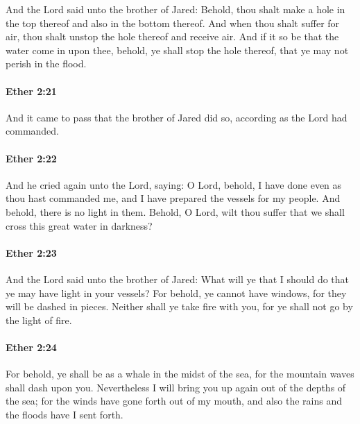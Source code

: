 			And the Lord said unto the brother of Jared:
			Behold, thou shalt make a hole in the top thereof
			and also in the bottom thereof.
			And when thou shalt suffer for air,
			thou shalt unstop the hole thereof and receive air.
			And if it so be that the water come in upon thee,
			behold, ye shall stop the hole thereof,
			that ye may not perish in the flood.

		\paragraph{Ether 2:21} %
			\label{ETHER-2-21}

			And it came to pass that the brother of Jared did so,
			according as the Lord had commanded.

		\paragraph{Ether 2:22} %
			\label{ETHER-2-22}

			And he cried again unto the Lord, saying:
			O Lord, behold, I have done even as thou hast commanded me,
			and I have prepared the vessels for my people.
			And behold, there is no light in them.
			Behold, O Lord, wilt thou suffer that we shall cross this great water in darkness?

		\paragraph{Ether 2:23} %
			\label{ETHER-2-23}

			And the Lord said unto the brother of Jared:
			What will ye that I should do that ye may have light in your vessels?
			For behold, ye cannot have windows,
			for they will be dashed in pieces.
			Neither shall ye take fire with you,
			for ye shall not go by the light of fire.

		\paragraph{Ether 2:24} %
			\label{ETHER-2-24}

			For behold, ye shall be as a whale in the midst of the sea,
			for the mountain waves shall dash upon you.
			Nevertheless I will bring you up again out of the depths of the sea;
			for the winds have gone forth out of my mouth,
			and also the rains and the floods have I sent forth.

